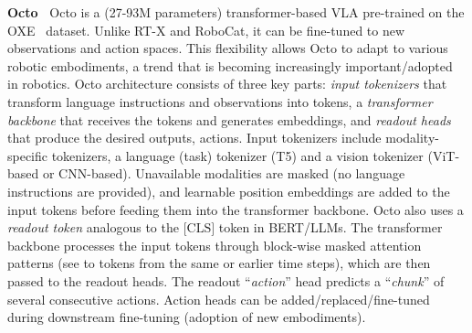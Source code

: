 
\noindent\textbf{ Octo~\cite{team2024octo}} Octo is a (27-93M parameters) transformer-based VLA pre-trained on the OXE~\cite{9} dataset. Unlike RT-X and RoboCat, it can be fine-tuned to new observations and action spaces. This flexibility allows Octo to adapt to various robotic embodiments, a trend that is becoming increasingly important/adopted in robotics.
Octo architecture consists of three key parts: \textit{input tokenizers} that transform language instructions and observations into tokens, a \textit{transformer backbone} that receives the tokens and generates embeddings, and \textit{readout heads} that produce the desired outputs, \ie actions. Input tokenizers include modality-specific tokenizers, \ie a language (task) tokenizer (\eg T5) and a vision tokenizer (\eg ViT-based or CNN-based). Unavailable modalities are masked (\eg no language instructions are provided), and learnable position embeddings are added to the input tokens before feeding them into the transformer backbone.  Octo also uses a \textit{readout token} analogous to the $\text{[CLS]}$ token in BERT/LLMs.
The transformer backbone processes the input tokens through block-wise masked attention patterns (\ie see to tokens from the same or earlier time steps), which are then passed to the readout heads. The readout ``\textit{action}'' head predicts a ``\textit{chunk}'' of several consecutive actions.
Action heads can be added/replaced/fine-tuned during downstream fine-tuning (\eg adoption of new embodiments).


